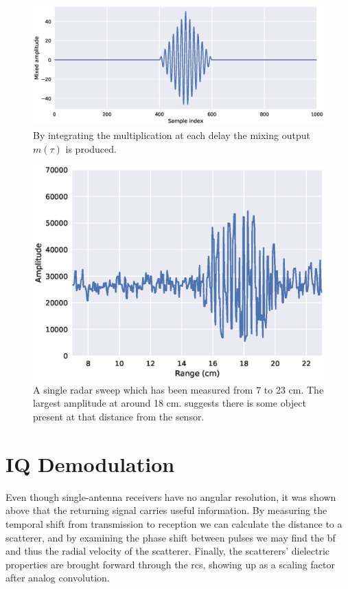 \begin{figure}[h]
	\centering
	\includegraphics[scale=0.5]{figs_temp/mixing2}
	\caption{By integrating the multiplication at each delay the mixing output $m(\tau)$ is produced.}
	\label{fig:mix2}
\end{figure}

\begin{figure}[h]
	\centering
	\includegraphics[scale=0.7]{figs_temp/single_sweep_raw}
	\caption{A single radar sweep which has been measured from 7 to 23 cm. The largest amplitude at around 18 cm. suggests there is some object present at that distance from the sensor.}
	\label{fig:single_sweep_raw}
\end{figure}

\section{IQ Demodulation}
\label{IQ}

Even though single-antenna receivers have no angular resolution, it was shown above that the returning signal carries useful information. By measuring the temporal shift from transmission to reception we can calculate the distance to a scatterer, and by examining the phase shift between pulses we may find the \gls{bf} and thus the radial velocity of the scatterer. Finally, the scatterers' dielectric properties are brought forward through the \gls{rcs}, showing up as a scaling factor after analog convolution. 


